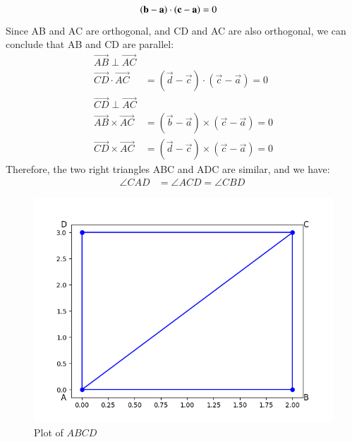 \documentclass[journal,12pt,twocolumn]{IEEEtran}
\begin{document}
\begin{align}
\left(\mathbf{b} - \mathbf{a}\right) \cdot \left(\mathbf{c} - \mathbf{a}\right) &= 0
\end{align}
Since AB and AC are orthogonal, and CD and AC are also orthogonal, we can conclude that AB and CD are parallel:
\begin{align}
\vec{AB} \perp \vec{AC}\\
\vec{CD} \cdot \vec{AC} &= (\vec{d} - \vec{c}) \cdot (\vec{c} - \vec{a}) = 0\\
\vec{CD} \perp \vec{AC}\\
\vec{AB} \times \vec{AC} &= (\vec{b} - \vec{a}) \times (\vec{c} - \vec{a}) = 0\\
\vec{CD} \times \vec{AC} &= (\vec{d} - \vec{c}) \times (\vec{c} - \vec{a}) = 0
\end{align}
Therefore, the two right triangles ABC and ADC are similar, and we have:
\begin{align}
\angle CAD &= \angle ACD = \angle CBD\
\end{align}
\begin{figure}[h!]
  \centering
   \includegraphics[width=\columnwidth]{figs/fig_1.png}
    \caption{Plot of $ABCD$}
     \label{fig:1}  
\end{figure}
\end{document}
